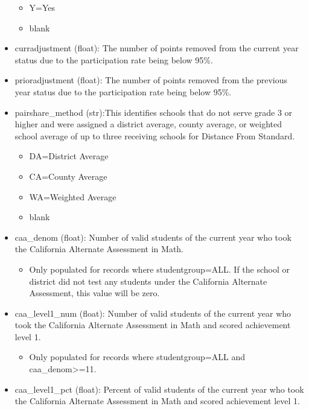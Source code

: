 \documentclass[11pt]{article}
\providecommand{\tightlist}{%
      \setlength{\itemsep}{0pt}\setlength{\parskip}{0pt}}
\begin{document}
\begin{itemize}
  \begin{itemize}
  \tightlist
  \item
    Y=Yes
  \item
    blank
  \end{itemize}
\item
  curradjustment (float): The number of points removed from the current
  year status due to the participation rate being below 95\%.
\item
  prioradjustment (float): The number of points removed from the
  previous year status due to the participation rate being below 95\%.
\item
  pairshare\_method (str):This identifies schools that do not serve
  grade 3 or higher and were assigned a district average, county
  average, or weighted school average of up to three receiving schools
  for Distance From Standard.

  \begin{itemize}
  \tightlist
  \item
    DA=District Average
  \item
    CA=County Average
  \item
    WA=Weighted Average
  \item
    blank
  \end{itemize}
\item
  caa\_denom (float): Number of valid students of the current year who
  took the California Alternate Assessment in Math.

  \begin{itemize}
  \tightlist
  \item
    Only populated for records where studentgroup=ALL. If the school or
    district did not test any students under the California Alternate
    Assessment, this value will be zero.
  \end{itemize}
\item
  caa\_level1\_num (float): Number of valid students of the current year
  who took the California Alternate Assessment in Math and scored
  achievement level 1.

  \begin{itemize}
  \tightlist
  \item
    Only populated for records where studentgroup=ALL and
    caa\_denom\textgreater{}=11.
  \end{itemize}
\item
  caa\_level1\_pct (float): Percent of valid students of the current
  year who took the California Alternate Assessment in Math and scored
  achievement level 1.


\end{itemize}
\end{document}
